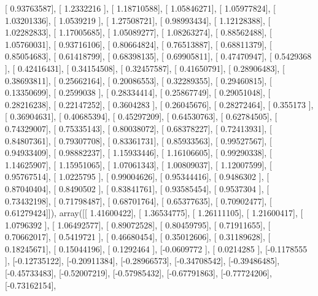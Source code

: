 \documentclass{article}
\begin{document}
       [ 0.93763587],
       [ 1.2332216 ],
       [ 1.18710588],
       [ 1.05846271],
       [ 1.05977824],
       [ 1.03201336],
       [ 1.0539219 ],
       [ 1.27508721],
       [ 0.98993434],
       [ 1.12128388],
       [ 1.02282833],
       [ 1.17005685],
       [ 1.05089277],
       [ 1.08263274],
       [ 0.88562488],
       [ 1.05760031],
       [ 0.93716106],
       [ 0.80664824],
       [ 0.76513887],
       [ 0.68811379],
       [ 0.85054683],
       [ 0.61418799],
       [ 0.68398135],
       [ 0.69905811],
       [ 0.47470947],
       [ 0.5429368 ],
       [ 0.42416431],
       [ 0.34154508],
       [ 0.32457587],
       [ 0.41650791],
       [ 0.28906483],
       [ 0.38693811],
       [ 0.25662164],
       [ 0.20086553],
       [ 0.32289355],
       [ 0.29460815],
       [ 0.13350699],
       [ 0.2599038 ],
       [ 0.28334414],
       [ 0.25867749],
       [ 0.29051048],
       [ 0.28216238],
       [ 0.22147252],
       [ 0.3604283 ],
       [ 0.26045676],
       [ 0.28272464],
       [ 0.355173  ],
       [ 0.36904631],
       [ 0.40685394],
       [ 0.45297209],
       [ 0.64530763],
       [ 0.62784505],
       [ 0.74329007],
       [ 0.75335143],
       [ 0.80038072],
       [ 0.68378227],
       [ 0.72413931],
       [ 0.84807361],
       [ 0.79307708],
       [ 0.83361731],
       [ 0.85933563],
       [ 0.99527567],
       [ 0.94933409],
       [ 0.98882237],
       [ 1.15933446],
       [ 1.16106605],
       [ 0.99290338],
       [ 1.14625907],
       [ 1.15951065],
       [ 1.07061343],
       [ 1.00809037],
       [ 1.12007599],
       [ 0.95767514],
       [ 1.0225795 ],
       [ 0.99004626],
       [ 0.95344416],
       [ 0.9486302 ],
       [ 0.87040404],
       [ 0.8490502 ],
       [ 0.83841761],
       [ 0.93585454],
       [ 0.9537304 ],
       [ 0.73432198],
       [ 0.71798487],
       [ 0.68701764],
       [ 0.65377635],
       [ 0.70902477],
       [ 0.61279424]]), array([[ 1.41600422],
       [ 1.36534775],
       [ 1.26111105],
       [ 1.21600417],
       [ 1.0796392 ],
       [ 1.06492577],
       [ 0.89072528],
       [ 0.80459795],
       [ 0.71911655],
       [ 0.70662017],
       [ 0.5419721 ],
       [ 0.46680454],
       [ 0.35012606],
       [ 0.31189628],
       [ 0.18245671],
       [ 0.15044196],
       [ 0.1292464 ],
       [-0.0609772 ],
       [ 0.0214285 ],
       [-0.1178555 ],
       [-0.12735122],
       [-0.20911384],
       [-0.28966573],
       [-0.34708542],
       [-0.39486485],
       [-0.45733483],
       [-0.52007219],
       [-0.57985432],
       [-0.67791863],
       [-0.77724206],
       [-0.73162154],
\end{document}
